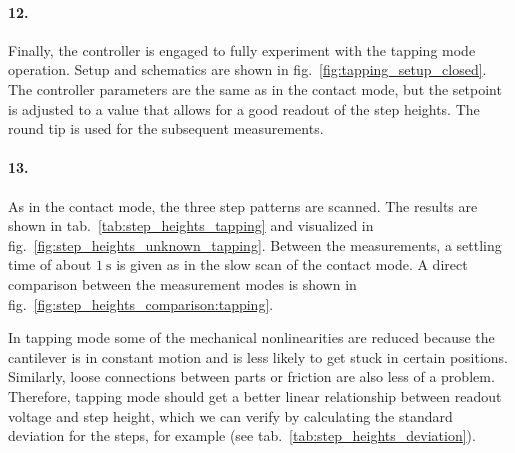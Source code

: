 \documentclass[a4paper,twoside,11pt,DIV=13,BCOR=5mm,numbers=noenddot]{scrbook}
\begin{document}

\paragraph*{12.}


Finally, the controller is engaged to fully experiment with the tapping mode operation. Setup and schematics are shown in fig.~\ref{fig:tapping_setup_closed}. The controller parameters are the same as in the contact mode, but the setpoint is adjusted to a value that allows for a good readout of the step heights.
The round tip is used for the subsequent measurements.

\paragraph*{13.}

As in the contact mode, the three step patterns are scanned. The results are shown in tab.~\ref{tab:step_heights_tapping} and visualized in fig.~\ref{fig:step_heights_unknown_tapping}.
Between the measurements, a settling time of about $\qty{1}{\s}$ is given as in the slow scan of the contact mode.
A direct comparison between the measurement modes is shown in fig.~\ref{fig:step_heights_comparison:tapping}.


In tapping mode some of the mechanical nonlinearities are reduced because the cantilever is in constant motion and is less likely to get stuck in certain positions.
Similarly, loose connections between parts or friction are also less of a problem. Therefore, tapping mode should get a better linear relationship between readout voltage and step height, which we can verify by
calculating the standard deviation for the steps, for example (see tab.~\ref{tab:step_heights_deviation}).

\end{document}
